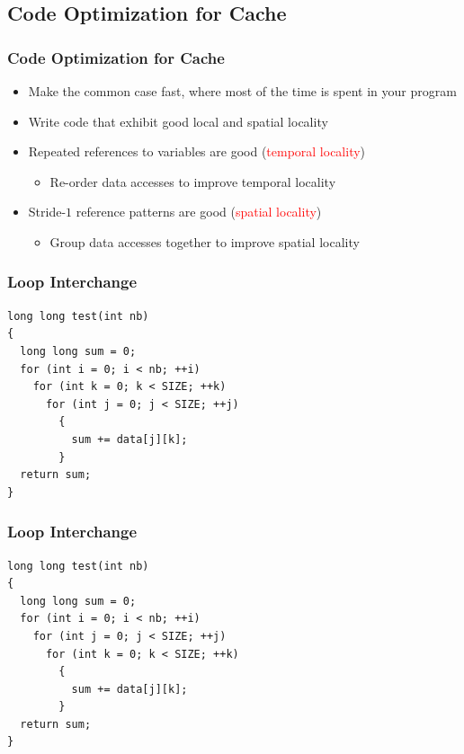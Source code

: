 \documentclass{beamer}
\begin{document}
\subsection{Code Optimization for Cache}

\begin{frame}%
\frametitle{Code Optimization for Cache}

\begin{itemize}
\item Make the common case fast, where most of the time is spent in your program
  \vspace{0.4cm}
\item Write code that exhibit good local and spatial locality
  \vspace{0.4cm}
\item Repeated references to variables are good (\textcolor{red}{temporal locality})
    \begin{itemize}
  \item Re-order data accesses to improve temporal locality
  \end{itemize}
  \vspace{0.4cm}
\item Stride-$1$ reference patterns are good (\textcolor{red}{spatial locality})
  \begin{itemize}
  \item Group data accesses together to improve spatial locality
  \end{itemize}
\end{itemize}

\end{frame}

\begin{frame}[fragile]
\frametitle{Loop Interchange}

\scriptsize

\begin{lstlisting}[linebackgroundcolor={\lstcolorlines{5,6,8}}]
long long test(int nb)
{
  long long sum = 0;
  for (int i = 0; i < nb; ++i)
    for (int k = 0; k < SIZE; ++k)
      for (int j = 0; j < SIZE; ++j)
        {
          sum += data[j][k];
        }
  return sum;
}
\end{lstlisting}

\end{frame}

\begin{frame}[fragile]
\frametitle{Loop Interchange}

\scriptsize

\begin{lstlisting}[linebackgroundcolor={\lstcolorlines{5,6,8}}]
long long test(int nb)
{
  long long sum = 0;
  for (int i = 0; i < nb; ++i)
    for (int j = 0; j < SIZE; ++j)
      for (int k = 0; k < SIZE; ++k)
        {
          sum += data[j][k];
        }
  return sum;
}
\end{lstlisting}

\end{frame}
\end{document}
